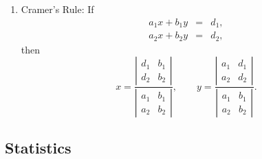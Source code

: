 \documentclass[a4paper,12pt]{article}
\begin{document}
\begin{enumerate}
\begin{enumerate}
\item Cramer's Rule: If
\begin{eqnarray*}
a_{1}x+b_{1}y &=&d_{1}, \\
a_{2}x+b_{2}y &=&d_{2},
\end{eqnarray*}%
then%
\begin{equation*}
x=\frac{\left\vert
\begin{array}{cc}
d_{1} & b_{1} \\
d_{2} & b_{2}%
\end{array}%
\right\vert }{\left\vert
\begin{array}{cc}
a_{1} & b_{1} \\
a_{2} & b_{2}%
\end{array}%
\right\vert },\qquad y=\frac{\left\vert
\begin{array}{cc}
a_{1} & d_{1} \\
a_{2} & d_{2}%
\end{array}%
\right\vert }{\left\vert
\begin{array}{cc}
a_{1} & b_{1} \\
a_{2} & b_{2}%
\end{array}%
\right\vert }.
\end{equation*}
\end{enumerate}
\end{enumerate}

\subsection{Statistics}
\end{document}
